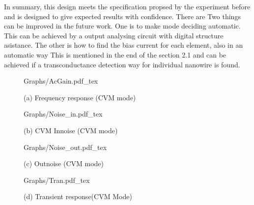 \documentclass{article}
\begin{document}
In summary, this design meets the specification propsed by the experiment before and is designed to give expected results with confidence.
There are Two things can be improved in the future work.
One is to make mode deciding automatic.
This can be achieved by a output analysing circuit with digital structure asistance.
The other is how to find the bias current for each element, also in an automatic way
This is mentioned in the end of the section 2.1 and can be achieved if a transconductance detection way for individual nanowire is found.






\begin{figure}[!hb]
    \begin{minipage}[b]{1\linewidth}
        \centering
        \def\svgwidth{8cm}
        \fontsize{6}{8}\selectfont
         {Graphs/AcGain.pdf_tex}
        \fontsize{8}{10}\selectfont
        \centerline{(a) Frequency response (CVM mode)}\medskip
    \end{minipage}


    \begin{minipage}[!htb]{0.5\linewidth}
        \centering
        \def\svgwidth{4cm}
        \fontsize{6}{8}\selectfont
         {Graphs/Noise_in.pdf_tex}
        \fontsize{8}{10}\selectfont
        \centerline{(b) CVM Innoise (CVM mode) }\medskip
    \end{minipage}
    \hfill
    \begin{minipage}[!htb]{0.5\linewidth}
        \centering
        \def\svgwidth{5.1cm}
        \fontsize{6}{8}\selectfont
         {Graphs/Noise_out.pdf_tex}
        \fontsize{8}{10}\selectfont
        \centerline{(c) Outnoise (CVM mode) }\medskip
    \end{minipage}

    \begin{minipage}[!hb]{1\linewidth}
        \centering
        \def\svgwidth{9cm}
        \fontsize{4}{6}\selectfont
         {Graphs/Tran.pdf_tex}
        \fontsize{8}{10}\selectfont
        \centerline{(d) Transient response(CVM Mode) }\medskip
    \end{minipage}
    \caption{}
    \label{fig:res}
\end{figure}
\end{document}
